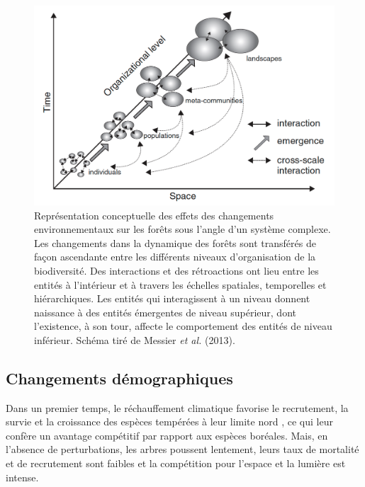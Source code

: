 \newpage

\begin{figure}
\centering
\includegraphics[width=.8\textwidth]{conclusion/figures/complex.png}
\caption[Effets des changements environnementaux sur les différents niveaux d'organisation de la biodiversité]{Représentation conceptuelle des effets des changements environnementaux sur les forêts sous l'angle d'un système complexe. Les changements dans la dynamique des forêts sont transférés de façon ascendante entre les différents niveaux d'organisation de la biodiversité. Des interactions et des rétroactions ont lieu entre les entités à l'intérieur et à travers les échelles spatiales, temporelles et hiérarchiques. Les entités qui interagissent à un niveau donnent naissance à des entités émergentes de niveau supérieur, dont l'existence, à son tour, affecte le comportement des entités de niveau inférieur. Schéma tiré de Messier \emph{et al.} (2013).}
\label{fig4.2}
\end{figure}

\hypertarget{changements-duxe9mographiques}{%
\subsection{Changements
démographiques}\label{changements-duxe9mographiques}}

Dans un premier temps, le réchauffement climatique favorise le
recrutement, la survie et la croissance des espèces tempérées à leur
limite nord
\citep{boisvertmarsh_divergent_2019, bolte_understory_2014, fisichelli_temperate_2014, goldblum_tree_2005, grundmann_impact_2011},
ce qui leur confère un avantage compétitif par rapport aux espèces
boréales. Mais, en l'absence de perturbations, les arbres poussent
lentement, leurs taux de mortalité et de recrutement sont faibles et la
compétition pour l'espace et la lumière est intense.

